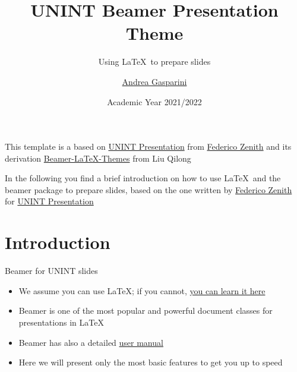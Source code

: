 \documentclass{beamer}
\title{UNINT Beamer Presentation Theme}
\subtitle{Using \LaTeX\ to prepare slides}
\author{\href{mailto:andrea@gasparini.cloud}{Andrea Gasparini}}
\date{Academic Year 2021/2022}
\newcommand{\hrefcol}[2]{\textcolor{cyan}{\href{#1}{#2}}}
\begin{document}
\maketitle

\begin{frame}

This template is a based on \hrefcol{https://www.overleaf.com/latex/templates/unint-presentation/jhbhdffczpnx}{UNINT Presentation} from \hrefcol{mailto:federico.zenith@unint.no}{Federico Zenith} and its derivation \hrefcol{https://github.com/TOB-KNPOB/Beamer-LaTeX-Themes}{Beamer-LaTeX-Themes} from Liu Qilong

\vspace{\baselineskip}

In the following you find a brief introduction on how to use \LaTeX\ and the beamer package to prepare slides, based on the one written by \hrefcol{mailto:federico.zenith@unint.no}{Federico Zenith} for \hrefcol{https://www.overleaf.com/latex/templates/unint-presentation/jhbhdffczpnx}{UNINT Presentation}


\end{frame}

\section{Introduction}

\begin{frame}{Beamer for UNINT slides}
\begin{itemize}
\item We assume you can use \LaTeX; if you cannot,
\hrefcol{http://en.wikibooks.org/wiki/LaTeX/}{you can learn it here}
\item Beamer is one of the most popular and powerful document
classes for presentations in \LaTeX
\item Beamer has also a detailed
\hrefcol{http://www.ctan.org/tex-archive/macros/latex/contrib/beamer/doc/beameruserguide.pdf}{user
 manual}
\item Here we will present only the most basic features to get you up to speed
\end{itemize}
\end{frame}
\end{document}
